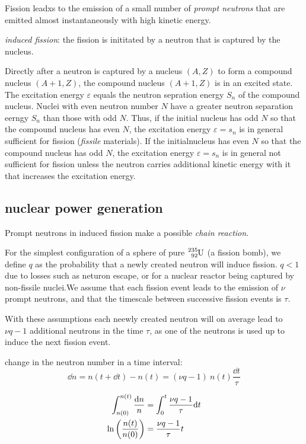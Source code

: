 \documentclass[10pt, a4paper, twocolumn]{article}
\newcommand{\deff}[1]{\par \noindent \textit{#1}: }
\begin{document}
Fission leadxs to the emission of a small number of \emph{prompt neutrons} that are emitted almost instantaneously with high kinetic energy.

\deff{induced fission}
the fission is inititated by a neutron that is captured by the nucleus.

Directly after a neutron is captured by a nucleus $(A,Z)$ to form a compound nucleus $(A+1,Z)$, the compound nucleus $(A+1,Z)$ is in an excited state. The excitation energy $\varepsilon$ equals the neutron sepration energy $S_n$ of the compound nucleus. Nuclei with even neutron number $N$ have a greater neutron separation eerngy $S_n$ than those with odd $N$. Thus, if the initial nucleus has odd $N$ so that the compound nucleus has even $N$, the excitation energy $\varepsilon =s_n$ is in general sufficient for fission (\emph{fissile} materials). If the initialnucleus has even $N$ so that the compound nucleus has odd $N$, the excitation energy $\varepsilon = s_n$ is in general not sufficient for fission unless the neutron carries additional kinetic energy with it that increases the excitation energy.

\subsection{nuclear power generation}

 Prompt neutrons in induced fission make a possible \emph{chain reaction}.

For the simplest configuration of a sphere of pure
$\ce{^{235}_{92}U}$ (a fission bomb), we define $q$ as the probability that a newly created neutron will induce fission. $q<1$ due to losses such as neturon escape, or for a nuclear reactor being captured by non-fissile nuclei.We assume that each fission event leads to the emission of $\nu$ prompt neutrons, and that the timescale between successive fission events is $\tau$.

With these assumptions each neewly created neutron will on average lead to $\nu q-1$ additional neutrons in the time $\tau$, as one of the neutrons is used up to induce the next fission event.

change in the neutron number in a time interval:
\[\dd n=n(t+\dd t)
-n(t) = (\nu q -1)\ n(t)\frac{\dd t}{\tau} \]

\begin{equation*}
\begin{aligned}
\int _{n(0)}^{n(t)}\frac{\dd n}{n}
&= \int _0^t\frac{\nu q-1}{\tau} \dd t
\\ \ln \pqty{\frac{n(t)}{n(0)}}&=\frac{\nu q-1}{\tau}t
\end{aligned}
\end{equation*}
\end{document}
